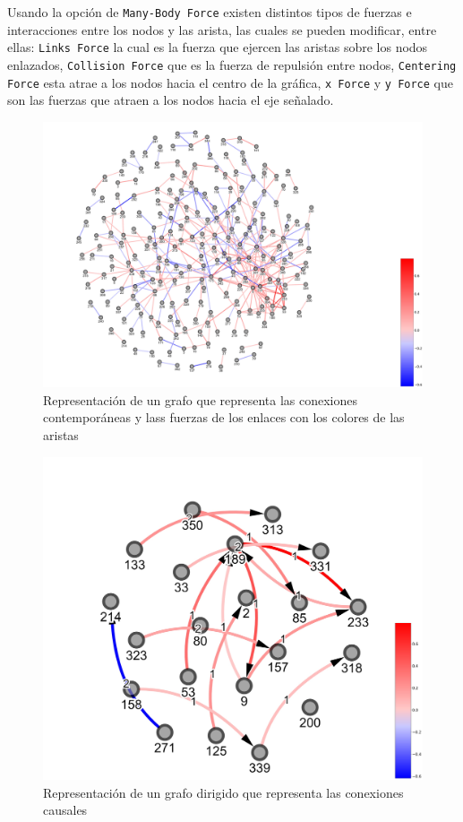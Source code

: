 \documentclass[a4paper,10pt,twocolumn]{article}
\begin{document}
Usando la opción de \texttt{Many-Body Force} existen distintos tipos de fuerzas e interacciones entre los nodos y las arista,
las cuales se pueden modificar, entre ellas: \texttt{Links Force} la cual es la fuerza que ejercen las aristas sobre los nodos
enlazados, \texttt{Collision Force} que es la fuerza de repulsión entre nodos, \texttt{Centering Force} esta atrae a los nodos hacia el centro de la gráfica, \texttt{x Force} y \texttt{y Force} que son las fuerzas que atraen a los nodos hacia el eje señalado.\\

\begin{figure}[h!]%
\includegraphics[scale=0.05]{graph_colorbar.jpg}
\caption{Representación de un grafo que representa las conexiones contemporáneas y lass fuerzas de los enlaces con los colores de las aristas}
\end{figure}


\begin{figure}[h!]%
\includegraphics[scale=0.1]{digraph_colorbar.jpg}
\caption{Representación de un grafo dirigido que representa las conexiones causales}
\end{figure}
\end{document}
